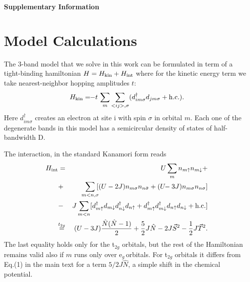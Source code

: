 \documentclass[aps,prl,amsmath, amssymb, english, aps, prl, onecolumn,
  reprint,floatfix, superscriptaddress]{revtex4-1}
\def\t2g{t${}_{2g}$}
\def\eg{e$_{g}\,$}
\begin{document}





\newpage
\mbox{}

\renewcommand{\thepage}{S\arabic{page}}  
\renewcommand{\thesection}{S\arabic{section}}   
\renewcommand{\thetable}{S\arabic{table}}   
\renewcommand{\thefigure}{S\arabic{figure}}
\newpage
{\bf\Large Supplementary Information}

\section{Model Calculations}
\setcounter{page}{1}
\setcounter{figure}{0}
\setcounter{table}{0}

The 3-band model that we solve in this work can be formulated in term of a tight-binding hamiltonian $H=H_{\rm kin}+H_{\rm int}$ where for the kinetic energy term we take nearest-neighbor hopping amplitudes $t$:
\begin{equation}
H_{\rm{kin}}= \!\! -t\,\sum_m \sum_{<ij>, \sigma}(d^\dagger_{im\sigma}d_{jm\sigma}+\rm{h.c.}).
\end{equation}
Here $d_{im\sigma}^{\dagger}$ creates an electron at site i with spin $\sigma$
in orbital $m$.  Each one of the degenerate bands in this model has a semicircular density of states of half-bandwidth D.

The interaction, in the standard Kanamori form \cite{imada_mit_review} reads
\begin{eqnarray} 
  H_{\rm int}&=&U\sum_m n_{m\uparrow}  n_{m\downarrow} + \\ \nonumber
\!\!\!\!&+&\sum_{m<n,\sigma}\!\![(U-2J) n_{m\sigma} n_{n\bar{\sigma}}  + (U\!\!-3J)n_{m\sigma}n_{n \sigma}]\nonumber \\
    &-& J \sum_{m<n} [ d_{m\uparrow}^{\dagger} d_{m\downarrow} d^{\dagger}_{n\downarrow} d_{n\uparrow} 
    + d_{m\uparrow}^{\dagger} d^{\dagger}_{m\downarrow} d_{n\uparrow} d_{n\downarrow} +
    \rm{h.c.} ]\nonumber \\ \nonumber
   &\overset{t_{2g}}{\mathop{=}}& (U-3J) \frac{\hat{N}(\hat{N}-1)}{2} +  \frac{5}{2} J \hat{N} 
   -2J \vec{S}^2 -\frac{1}{2}J \vec{T}^2.
\end{eqnarray}
The last equality holds only for the \t2g orbitals, but
the rest of the Hamiltonian  remains valid also if
$m$ runs only over \eg orbitals. For \t2g orbitals it differs from
Eq.(1) in the main text for a term $5/2 J \hat{N}$, a simple shift in the chemical potential. 
\end{document}
